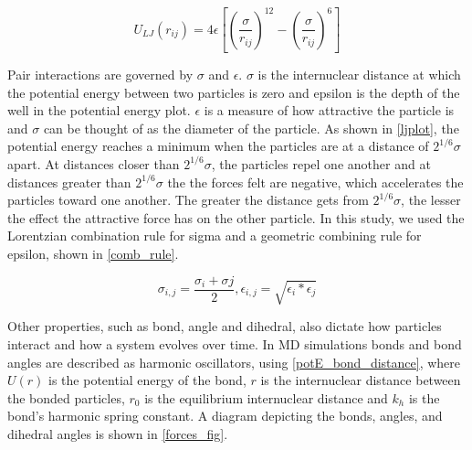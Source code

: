 \begin{equation}
    U_{LJ}(r_{ij}) = 4\epsilon \left[ \left({\frac{\sigma}{r_{ij}}}\right)^{12} - \left({\frac{\sigma}{r_{ij}}}\right)^{6} \right]
    \label{lj-equation}
\end{equation}

Pair interactions are governed by $\sigma$ and $\epsilon$. $\sigma$ is the internuclear distance at which the potential energy between two particles is zero and epsilon is the depth of the well in the potential energy plot. $\epsilon$ is a measure of how attractive the particle is and $\sigma$ can be thought of as the diameter of the particle. As shown in \autoref{ljplot}, the potential energy reaches a minimum when the particles are at a distance of $2^{1/6}\sigma$ apart. At distances closer than $2^{1/6}\sigma$, the particles repel one another and at distances greater than $2^{1/6}\sigma$ the the forces felt are negative, which accelerates the particles toward one another. The greater the distance gets from $2^{1/6}\sigma$, the lesser the effect the attractive force has on the other particle. In this study, we used the Lorentzian combination rule for sigma and a geometric combining rule for epsilon, shown in \autoref{comb_rule}. 

\begin{equation}
    \sigma_{i,j} = \frac{\sigma_{i} + \sigma{j}}{2}  ,   \epsilon_{i,j} = \sqrt{\epsilon_{i} * \epsilon_{j}}
    \label{comb_rule}
\end{equation}

Other properties, such as bond, angle and dihedral, also dictate how particles interact and how a system evolves over time. In MD simulations bonds and bond angles are described as harmonic oscillators, using \autoref{potE_bond_distance}, where $U(r)$ is the potential energy of the bond, $r$ is the internuclear distance between the bonded particles, $r_0$ is the equilibrium internuclear distance and $k_h$ is the bond's harmonic spring constant. A diagram depicting the bonds, angles, and dihedral angles is shown in \autoref{forces_fig}. 

